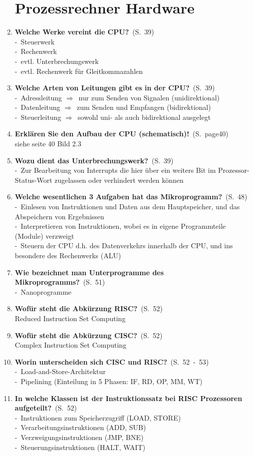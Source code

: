 \documentclass[a4paper,12pt]{article}
\newcommand{\question}[3]{\pagebreak[3]\item {\textbf{#1?}}\ (S.\ #2)#3}
\newcommand{\statement}[3]{\pagebreak[3]\item {\textbf{#1!}}\ (S.\ #2)#3}
\newcommand{\catchword}[1]{\\-\ #1}
\newcommand{\normaltext}[1]{\\#1}
\newcommand{\resultol}[1]{ $\Rightarrow$\ #1}
\newcommand{\page}[1]{#1}
\newcommand{\pages}[2]{#1\ -\ #2}
\begin{document}
\begin{enumerate}
  \newpage
  \section{Prozessrechner Hardware}


  \question{Welche Werke vereint die CPU}{\page{39}}
  {
    \catchword{Steuerwerk}
    \catchword{Rechenwerk}
    \catchword{evtl. Unterbrechungswerk}
    \catchword{evtl. Rechenwerk für Gleitkommazahlen}
  }

  \question{Welche Arten von Leitungen gibt es in der CPU}{\page{39}}
  {
    \catchword{Adressleitung \resultol{nur zum Senden von Signalen (unidirektional)}}
    \catchword{Datenleitung \resultol{zum Senden und Empfangen (bidirektional)}}
    \catchword{Steuerleitung \resultol{sowohl uni- als auch bidirektional ausgelegt}}
  }

  \statement{Erklären Sie den Aufbau der CPU (schematisch)} {page{40}}
  {
  \normaltext{siehe seite 40 Bild 2.3}
  }

  \question{Wozu dient das Unterbrechungswerk}{\page{39}}
  {
    \catchword{Zur Bearbeitung von Interrupts die hier über ein weiters Bit im Prozessor-
    Status-Wort zugelassen oder verhindert werden können}
  }

  \question{Welche wesentlichen 3 Aufgaben hat das Mikroprogramm}{\page{48}}
  {
    \catchword{Einlesen von Instruktionen und Daten aus dem Hauptspeicher, und das Abspeichern 
               von Ergebnissen}
    \catchword{Interpretieren von Instruktionen, wobei es in eigene Programmteile (Module) verzweigt}
    \catchword{Steuern der CPU d.h. des Datenverkehrs innerhalb der CPU, und ins besondere 
               des Rechenwerks (ALU)}
  }

  \question{Wie bezeichnet man Unterprogramme des Mikroprogramms}{\page{51}}
  {
    \catchword{Nanoprogramme}
  }

  \question{Wofür steht die Abkürzung RISC}{\page{52}}
  {
    \normaltext{Reduced Instruction Set Computing}
  }

  \question{Wofür steht die Abkürzung CISC}{\page{52}}
  {
    \normaltext{Complex Instruction Set Computing}
  }

  \question{Worin unterscheiden sich CISC und RISC}{\pages{52}{53}}
  {
    \catchword{Load-and-Store-Architektur}
    \catchword{Pipelining (Einteilung in 5 Phasen: IF, RD, OP, MM, WT)}
  }

  \question{In welche Klassen ist der Instruktionssatz bei RISC Prozessoren aufgeteilt}{\page{52}}
  {
    \catchword{Instruktionen zum Speicherzugriff (LOAD, STORE)}
    \catchword{Verarbeitungsinstruktionen (ADD, SUB)}
    \catchword{Verzweigungsinstruktionen (JMP, BNE)}
    \catchword{Steuerungsinstruktionen (HALT, WAIT)}
  }


\end{enumerate}
\end{document}
